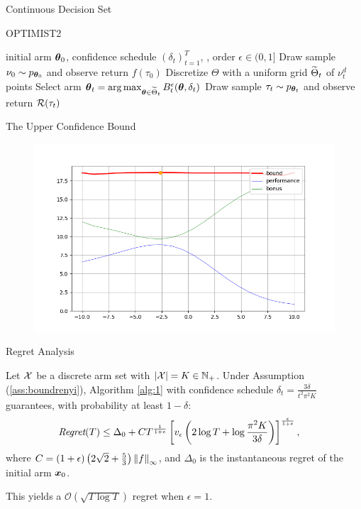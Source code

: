 \begin{frame}{Continuous Decision Set}

\onslide<+->
\begin{algorithm}[H]
	\caption{OPTIMIST2} \label{alg:2}
	\begin{algorithmic}[1]
		 initial arm $\vtheta_0$, confidence schedule $(\delta_t)_{t=1}^T$, , order $\epsilon\in(0,1]$
		\State Draw sample $\nu_0\sim p_{\vtheta_0}$ and observe return $f(\tau_0)$
		\State Discretize $\Theta$ with a uniform grid $\wt{\Theta}_t$ of $\nu_t^d$ points
		\State Select arm $\vtheta_t = \arg\max_{\vtheta\in\wt{\Theta}_t}B_t^{\epsilon}(\vtheta,\delta_t)$
		\State Draw sample $\tau_t\sim p_{\vtheta_t}$ and observe return $\Rew(\tau_t)$
		\EndFor
	\end{algorithmic}
\end{algorithm}

\end{frame}

\begin{frame}{The Upper Confidence Bound}

\begin{figure}
		\centering
		\includegraphics[width=0.7\linewidth]{Images/bound}
\end{figure}
\end{frame}

\begin{frame}{Regret Analysis}
\begin{theorem}[1]
Let $\Xspace$ be a discrete arm set with ${|\mathcal{X}| = K \in \Naturals_{+}}$. Under Assumption (\ref{ass:boundrenyi}), Algorithm \ref{alg:1} with confidence schedule $\delta_t = \frac{3\delta}{t^2\pi^2K}$ guarantees, with probability at least $1-\delta$:
	\begin{align*}
		&\Reg(T) \leq \Delta_0 + C
			T^{\frac{1}{1+\epsilon}}
			\left[v_{\epsilon}
			\left(2\log T + \log \frac{\pi^2K}{3\delta}\right)
			\right]^{\frac{\epsilon}{1+\epsilon}},
	\end{align*}
	where $C=(1+\epsilon)\left(2\sqrt{2}+\frac{5}{3}\right)\norm[\infty]{f}$, and $\Delta_0$ is the instantaneous regret of the initial arm $\vx_0$.
\end{theorem}
This yields a $\mathcal{O}(\sqrt{T\log{T}})$ regret when $\epsilon=1$.
\end{frame}


